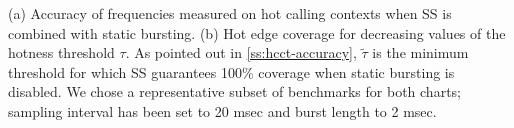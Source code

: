 \label{fig:hcct-bursting} (a) Accuracy of frequencies measured on hot calling contexts when SS is combined with static bursting. (b) Hot edge coverage for decreasing values of the hotness threshold $\tau$. As pointed out in \mysection\ref{ss:hcct-accuracy}, $\widetilde\tau$ is the minimum threshold for which SS guarantees 100\% coverage when static bursting is disabled. We chose a representative subset of benchmarks for both charts; sampling interval has been set to 20 msec and burst length to 2 msec.